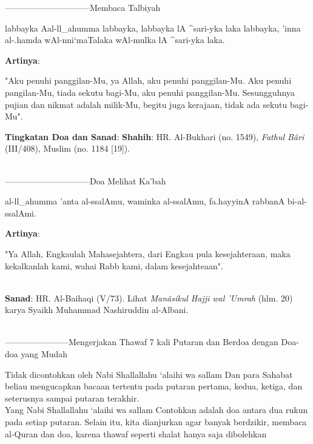 \documentclass[a4paper,12pt]{article}
\begin{document}
\par
{}------------------------------Membaca Talbiyah
\begin{arabtext}
\noindent
labbayka Aal-ll_ahumma labbayka, labbayka lA ^sari-yka laka labbayka, 'inna 
al-.hamda wAl-nni`maTalaka wAl-mulka lA ^sari-yka laka.\\
\end{arabtext}
\noindent
\textbf{Artinya}:
\par
\indent
"Aku penuhi panggilan-Mu, ya Allah, aku penuhi panggilan-Mu. Aku penuhi 
pangilan-Mu, tiada sekutu bagi-Mu, aku penuhi panggilan-Mu. Sesungguhnya 
pujian dan nikmat adalah milik-Mu, begitu juga kerajaan, tidak ada sekutu 
bagi-Mu".\\
\par
\noindent
\textbf{Tingkatan Doa dan Sanad}: \textbf{Shahih}: HR. Al-Bukhari (no. 
1549), \textit{Fathul B\^{a}ri} (III/408), Muslim (no. 1184 [19]).\\\\
\par
{}------------------------------Doa Melihat Ka'bah
\begin{arabtext}
\noindent
al-ll_ahumma 'anta al-ssalAmu, waminka al-ssalAmu, fa.hayyinA rabbanA 
bi-al-ssalAmi.\\
\end{arabtext}
\noindent
\textbf{Artinya}:
\par
\indent
"Ya Allah, Engkaulah Mahasejahtera, dari Engkau pula kesejahteraan, maka 
kekalkanlah kami, wahai Rabb kami, dalam kesejahteaan".\\\\
\par
\noindent
\textbf{Sanad}: HR. Al-Baihaqi (V/73). Lihat \textit{Man\^{a}sikul Hajji 
wal 'Umrah} (hlm. 20) karya Syaikh Muhammad Nashiruddin al-Albani.\\\\
\par
{}-----------------------Mengerjakan Thawaf 7 kali Putaran dan 
Berdoa dengan Doa-doa yang Mudah
\par
\indent
Tidak dicontohkan oleh Nabi Shallallahu ‘alaihi wa sallam Dan para Sahabat 
beliau mengucapkan bacaan tertentu pada putaran pertama, kedua, ketiga, dan 
seterusnya sampai putaran terakhir.\\
\indent
Yang Nabi Shallallahu ‘alaihi wa sallam Contohkan adalah doa antara dua rukun 
pada setiap putaran. Selain itu, kita dianjurkan agar banyak berdzikir, 
membaca al-Quran dan doa, karena thawaf seperti shalat hanya saja dibolehkan 
\end{document}
